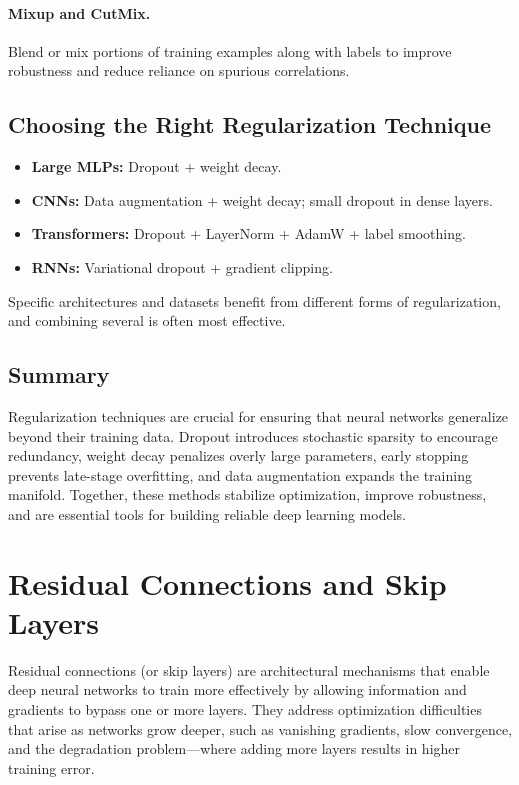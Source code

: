 \documentclass[12pt,a4paper]{report}
\begin{document}
\paragraph{Mixup and CutMix.}  
Blend or mix portions of training examples along with labels to improve robustness and reduce reliance on spurious correlations.

\vspace{1em}
\subsection{Choosing the Right Regularization Technique}

\begin{itemize}
    \item \textbf{Large MLPs:} Dropout + weight decay.
    \item \textbf{CNNs:} Data augmentation + weight decay; small dropout in dense layers.
    \item \textbf{Transformers:} Dropout + LayerNorm + AdamW + label smoothing.
    \item \textbf{RNNs:} Variational dropout + gradient clipping.
\end{itemize}

Specific architectures and datasets benefit from different forms of regularization, and combining several is often most effective.

\vspace{1em}
\subsection{Summary}

Regularization techniques are crucial for ensuring that neural networks generalize beyond their training data.  
Dropout introduces stochastic sparsity to encourage redundancy, weight decay penalizes overly large parameters, early stopping prevents late-stage overfitting, and data augmentation expands the training manifold.  
Together, these methods stabilize optimization, improve robustness, and are essential tools for building reliable deep learning models.

\section{Residual Connections and Skip Layers}

Residual connections (or skip layers) are architectural mechanisms that enable deep neural networks to train more effectively by allowing information and gradients to bypass one or more layers. 
They address optimization difficulties that arise as networks grow deeper, such as vanishing gradients, slow convergence, and the degradation problem—where adding more layers results in higher training error.
\end{document}
